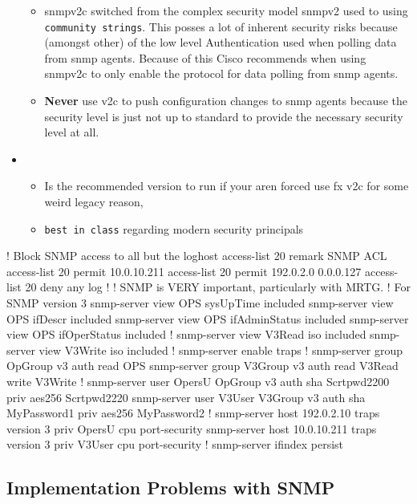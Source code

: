 \begin{itemize}
	\begin{itemize}
		\item \gls{snmp}v2c switched from the complex security model \gls{snmp}v2 used to using \texttt{community strings}. This posses a lot of inherent security risks because (amongst other) of the low level Authentication used when polling data from \gls{snmp} agents. Because of this Cisco recommends when using \gls{snmp}v2c to only enable the protocol for data polling from \gls{snmp} agents.
		\item \textbf{Never} use v2c to push configuration changes to \gls{snmp} agents because the security level is just not up to standard to provide the necessary security level at all.
	\end{itemize}
	\item {}
	\begin{itemize}
		\item Is the recommended version to run if your aren forced use fx v2c for some weird legacy reason,
		\item \texttt{best in class} regarding modern security principals
	\end{itemize}
\end{itemize}


\begin{cisco}
! Block SNMP access to all but the loghost
access-list 20 remark SNMP ACL
access-list 20 permit 10.0.10.211
access-list 20 permit 192.0.2.0 0.0.0.127
access-list 20 deny any log
!
! SNMP is VERY important, particularly with MRTG.
! For SNMP version 3
snmp-server view OPS sysUpTime included
snmp-server view OPS ifDescr included
snmp-server view OPS ifAdminStatus included
snmp-server view OPS ifOperStatus included
!
snmp-server view V3Read iso included
snmp-server view V3Write iso included
!
snmp-server enable traps
!
snmp-server group OpGroup v3 auth read OPS
snmp-server group V3Group v3 auth read V3Read write V3Write
!
snmp-server user OpersU OpGroup v3 auth sha Scrtpwd2200 priv aes256 Scrtpwd2220
snmp-server user V3User V3Group v3 auth sha MyPassword1 priv aes256 MyPassword2
!
snmp-server host 192.0.2.10 traps version 3 priv OpersU cpu port-security
snmp-server host 10.0.10.211 traps version 3 priv V3User cpu port-security
!
snmp-server ifindex persist
\end{cisco}

\subsection{Implementation Problems with SNMP}

